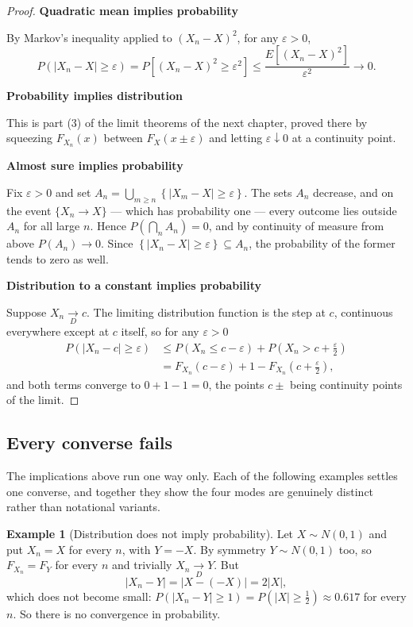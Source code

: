 \documentclass[11pt,a4paper]{article}
\theoremstyle{definition}
\newtheorem{exa}[thm]{Example}
\newcommand{\subhead}[1]{%
  \par\medskip\noindent\textbf{#1}\par\nobreak\smallskip}
\begin{document}
\begin{proof}
\subhead{Quadratic mean implies probability}
By Markov's inequality applied to $\left(X_n-X\right)^{2}$, for any
$\varepsilon>0$,
$$P\left(\left|X_n-X\right|\geq\varepsilon\right)
= P\left[\left(X_n-X\right)^{2}\geq\varepsilon^{2}\right]
\leq \frac{E\left[\left(X_n-X\right)^{2}\right]}{\varepsilon^{2}}
\longrightarrow 0 .$$

\subhead{Probability implies distribution}
This is part (3) of the limit theorems of the next chapter, proved there by
squeezing $F_{X_n}(x)$ between $F_X(x\pm\varepsilon)$ and letting
$\varepsilon\downarrow0$ at a continuity point.

\subhead{Almost sure implies probability}
Fix $\varepsilon>0$ and set
$A_n = \bigcup_{m\geq n}\left\{\left|X_m-X\right|\geq\varepsilon\right\}$. The
sets $A_n$ decrease, and on the event $\{X_n\rightarrow X\}$ --- which has
probability one --- every outcome lies outside $A_n$ for all large $n$. Hence
$P\left(\bigcap_n A_n\right)=0$, and by continuity of measure from above
$P(A_n)\rightarrow0$. Since
$\left\{\left|X_n-X\right|\geq\varepsilon\right\}\subseteq A_n$, the probability
of the former tends to zero as well.

\subhead{Distribution to a constant implies probability}
Suppose $X_n\underset{D}{\longrightarrow}c$. The limiting distribution function
is the step at $c$, continuous everywhere except at $c$ itself, so for any
$\varepsilon>0$
\begin{align*}
P\left(\left|X_n-c\right|\geq\varepsilon\right)
&\leq P\left(X_n \leq c-\varepsilon\right) + P\left(X_n > c+\tfrac{\varepsilon}{2}\right)\\
&= F_{X_n}\left(c-\varepsilon\right) + 1 - F_{X_n}\left(c+\tfrac{\varepsilon}{2}\right),
\end{align*}
and both terms converge to $0 + 1 - 1 = 0$, the points $c\pm$ being continuity
points of the limit.
\end{proof}

\subsection{Every converse fails}

The implications above run one way only. Each of the following examples settles
one converse, and together they show the four modes are genuinely distinct
rather than notational variants.

\begin{exa}[Distribution does not imply probability]
Let $X\sim N(0,1)$ and put $X_n = X$ for every $n$, with $Y=-X$. By symmetry
$Y\sim N(0,1)$ too, so $F_{X_n} = F_Y$ for every $n$ and trivially
$X_n\underset{D}{\longrightarrow}Y$. But
$$\left|X_n - Y\right| = \left|X - (-X)\right| = 2\left|X\right| ,$$
which does not become small: $P\left(\left|X_n-Y\right|\geq1\right)
= P\left(\left|X\right|\geq\tfrac12\right)\approx 0.617$ for every $n$. So there
is no convergence in probability.
\end{exa}
\end{document}
